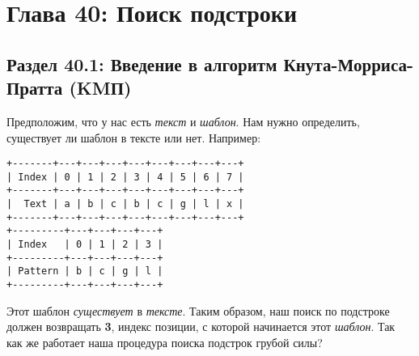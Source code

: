 \chapter*{Глава 40: Поиск подстроки}
\section*{Раздел 40.1: Введение в алгоритм Кнута-Морриса-Пратта (KMП)}
Предположим, что у нас есть \textit{текст} и \textit{шаблон}. Нам нужно определить, существует ли шаблон в тексте
или нет. Например:
\vspace{\baselineskip}
\begin{tcolorbox}\begin{verbatim}
+-------+---+---+---+---+---+---+---+---+
| Index | 0 | 1 | 2 | 3 | 4 | 5 | 6 | 7 |
+-------+---+---+---+---+---+---+---+---+
|  Text | a | b | c | b | c | g | l | x |
+-------+---+---+---+---+---+---+---+---+
+---------+---+---+---+---+
| Index   | 0 | 1 | 2 | 3 |
+---------+---+---+---+---+
| Pattern | b | c | g | l |
+---------+---+---+---+---+
\end{verbatim} 
\end{tcolorbox}
\vspace{\baselineskip}
Этот шаблон \textit{существует} в \textit{тексте}. Таким образом, наш поиск по подстроке должен возвращать \textbf{3}, индекс
позиции, с которой начинается этот \textit{шаблон}. Так как же работает наша процедура поиска подстрок
грубой силы?
\vspace{\baselineskip}


